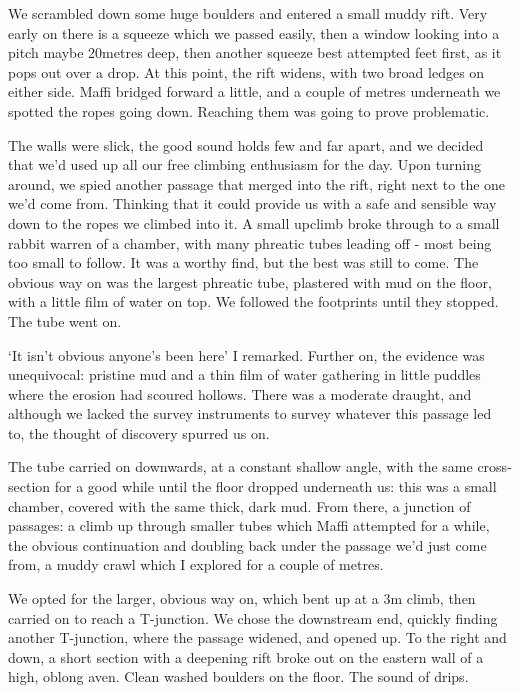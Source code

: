 We scrambled down some huge boulders and entered a small muddy rift. Very early on there is a squeeze which we passed easily, then a window looking into a pitch maybe 20metres deep, then another squeeze best attempted feet first, as it pops out over a drop. At this point, the rift widens, with two broad ledges on either side. Maffi bridged forward a little, and a couple of metres underneath we spotted the ropes going down. Reaching them was going to prove problematic. 

The walls were slick, the good sound holds few and far apart, and we decided that we’d used up all our free climbing enthusiasm for the day. Upon turning around, we spied another passage that merged into the rift, right next to the one we’d come from. Thinking that it could provide us with a safe and sensible way down to the ropes we climbed into it. 
A small upclimb broke through to a small rabbit warren of a chamber, with many phreatic tubes leading off - most being too small to follow. It was a worthy find, but the best was still to come. The obvious way on was the largest phreatic tube, plastered with mud on the floor, with a little film of water on top. We followed the footprints until they stopped. The tube went on.

‘It isn’t obvious anyone’s been here’ I remarked. Further on, the evidence was unequivocal: pristine mud and a thin film of water gathering in little puddles where the erosion had scoured hollows. There was a moderate draught, and although we lacked the survey instruments to survey whatever this passage led to, the thought of discovery spurred us on. 

The tube carried on downwards, at a constant shallow angle, with the same cross-section for a good while until the floor dropped underneath us: this was a small chamber, covered with the same thick, dark mud. From there, a junction of passages: a climb up through smaller tubes which Maffi attempted for a while, the obvious continuation and doubling back under the passage we’d just come from, a muddy crawl which I explored for a couple of metres. 

We opted for the larger, obvious way on, which bent up at a 3m climb, then carried on to reach a T-junction. We chose the downstream end, quickly finding another T-junction, where the passage widened, and opened up. To the right and down, a short section with a deepening rift broke out on the eastern wall of a high, oblong aven. Clean washed boulders on the floor. The sound of drips. 

